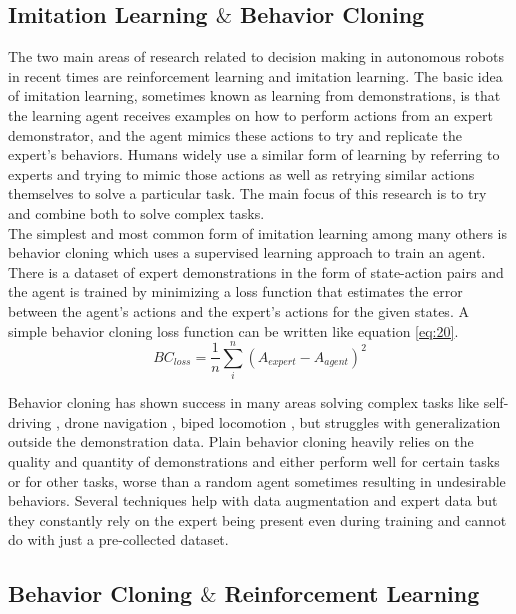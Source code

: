 \subsection{Imitation Learning $\&$ Behavior Cloning}

The two main areas of research related to decision making in autonomous robots in recent times are reinforcement learning and imitation learning. The basic idea of imitation learning, sometimes known as learning from demonstrations, is that the learning agent receives examples on how to perform actions from an expert demonstrator, and the agent mimics these actions to try and replicate the expert's behaviors. Humans widely use a similar form of learning by referring to experts and trying to mimic those actions as well as retrying similar actions themselves to solve a particular task. The main focus of this research is to try and combine both to solve complex tasks. \\

The simplest and most common form of imitation learning among many others is behavior cloning which uses a supervised learning approach to train an agent. There is a dataset of expert demonstrations in the form of state-action pairs and the agent is trained by minimizing a loss function that estimates the error between the agent's actions and the expert's actions for the given states. A simple behavior cloning loss function can be written like equation \ref{eq:20}. \\

\begin{equation}\label{eq:20}
    BC_{loss} = \frac{1}{n} \sum_{i}^{n} (A_{expert} - A_{agent})^2
\end{equation}

Behavior cloning has shown success in many areas solving complex tasks like self-driving \cite{bojarski2016end}, drone navigation \cite{QN}, biped locomotion \cite{BL}, but struggles with generalization outside the demonstration data. Plain behavior cloning heavily relies on the quality and quantity of demonstrations and either perform well for certain tasks or for other tasks, worse than a random agent sometimes resulting in undesirable behaviors. Several techniques help with data augmentation and expert data but they constantly rely on the expert being present even during training and cannot do with just a pre-collected dataset. \\

\subsection{Behavior Cloning $\&$ Reinforcement Learning}

